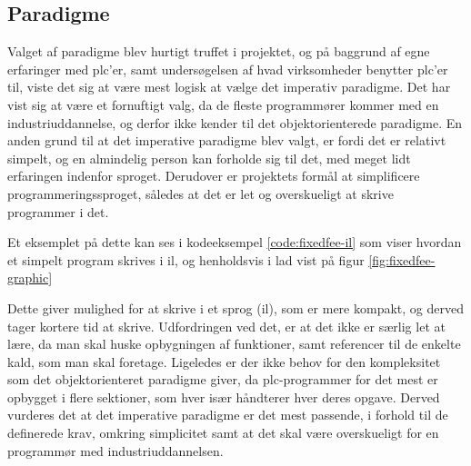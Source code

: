 \subsection*{Paradigme}
Valget af paradigme blev hurtigt truffet i projektet, og på baggrund af egne erfaringer med \gls{plc}'er, samt undersøgelsen af hvad virksomheder benytter \gls{plc}'er til, viste det sig at være mest logisk at vælge det imperativ paradigme.
Det har vist sig at være et fornuftigt valg, da de fleste programmører kommer med en industriuddannelse, og derfor ikke kender til det objektorienterede paradigme.
En anden grund til at det imperative paradigme blev valgt, er fordi det er relativt simpelt, og en almindelig person kan forholde sig til det, med meget lidt erfaringen indenfor sproget. 
Derudover er projektets formål at simplificere programmeringssproget, således at det er let og overskueligt at skrive programmer i det.

Et eksemplet på dette kan ses i kodeeksempel \ref{code:fixedfee-il} som viser hvordan et simpelt program skrives i \gls{il}, og henholdsvis i \gls{lad} vist på figur \ref{fig:fixedfee-graphic}

Dette giver mulighed for at skrive i et sprog (\gls{il}), som er mere kompakt, og derved tager kortere tid at skrive. Udfordringen ved det, er at det ikke er særlig let at lære, da man skal huske opbygningen af funktioner, samt referencer til de enkelte kald, som man skal foretage.
Ligeledes er der ikke behov for den kompleksitet som det objektorienteret paradigme giver, da \gls{plc}-programmer for det mest er opbygget i flere sektioner, som hver især håndterer hver deres opgave.
Derved vurderes det at det imperative paradigme er det mest passende, i forhold til de definerede krav, omkring simplicitet samt at det skal være overskueligt for en programmør med industriuddannelsen.

